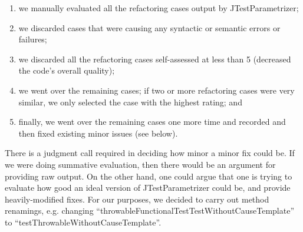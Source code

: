  \begin{enumerate}

  \item \label{item:selecting-pr-step-one} we manually evaluated all the refactoring cases output by JTestParametrizer;

  \item \label{item:selecting-pr-step-two} we discarded cases that were causing any syntactic or semantic errors or failures;

  \item \label{item:selecting-pr-step-three} we discarded all the refactoring cases self-assessed at less than 5 (decreased the code's overall quality);
  
  \item \label{item:selecting-representative} we went over the remaining cases; if two or more refactoring cases were very similar, we only selected the case with the highest rating; and
  
  \item \label{item:minor-changes} finally, we went over the remaining cases one more time and recorded and then fixed existing minor issues (see below). 
\end{enumerate}

There is a judgment call required in deciding how minor a minor fix could be. If we were doing summative evaluation, then there would be an argument for providing raw output. On the other hand, one could argue that one is trying to evaluate how good an ideal version of JTestParametrizer could be, and provide heavily-modified fixes. For our purposes, we decided to carry out method renamings, e.g. changing ``throwableFunctionalTestTestWithoutCauseTemplate'' to ``testThrowableWithoutCauseTemplate''.





  
